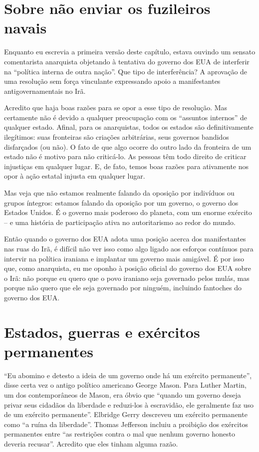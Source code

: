 \section{Sobre não enviar os fuzileiros navais}

Enquanto eu escrevia a primeira versão deste capítulo, estava ouvindo um sensato comentarista anarquista objetando à tentativa do governo dos EUA de interferir na ``política interna de outra nação''. Que tipo de interferência? A aprovação de uma resolução sem força vinculante expressando apoio a manifestantes antigovernamentais no Irã.

Acredito que haja boas razões para se opor a esse tipo de resolução. Mas certamente não é devido a qualquer preocupação com os ``assuntos internos'' de qualquer estado. Afinal, para os anarquistas, todos os estados são definitivamente ilegítimos: suas fronteiras são criações arbitrárias, seus governos bandidos disfarçados (ou não). O fato de que algo ocorre do outro lado da fronteira de um estado não é motivo para não criticá-lo. As pessoas têm todo direito de criticar injustiças em qualquer lugar. E, de fato, temos boas razões para ativamente nos opor à ação estatal injusta em qualquer lugar.

Mas veja que não estamos realmente falando da oposição por indivíduos ou grupos íntegros: estamos falando da oposição por um governo, o governo dos Estados Unidos. É o governo mais poderoso do planeta, com um enorme exército -- e uma história de participação ativa no autoritarismo ao redor do mundo. 

Então quando o governo dos EUA adota uma posição acerca dos manifestantes nas ruas do Irã, é difícil não ver isso como algo ligado aos esforços contínuos para intervir na política iraniana e implantar um governo mais amigável. É por isso que, como anarquista, eu me oponho à posição oficial do governo dos EUA sobre o Irã: não porque eu quero que o povo iraniano seja governado pelos mulás, mas porque não quero que ele seja governado por ninguém, incluindo fantoches do governo dos EUA.

\section{Estados, guerras e exércitos permanentes}

``Eu abomino e detesto a ideia de um governo onde há um exército permanente'', disse certa vez o antigo político americano George Mason. Para Luther Martin, um dos contemporâneos de Mason, era óbvio que ``quando um governo deseja privar seus cidadãos da liberdade e reduzi-los à escravidão, ele geralmente faz uso de um exército permanente''. Elbridge Gerry descreveu um exército permanente como ``a ruína da liberdade''. Thomas Jefferson incluiu a proibição dos exércitos permanentes entre ``as restrições contra o mal que nenhum governo honesto deveria recusar''. Acredito que eles tinham alguma razão.

